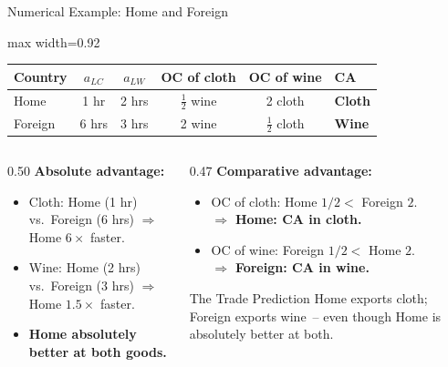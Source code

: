 \documentclass[aspectratio=169]{beamer}
\begin{document}
\begin{frame}{Numerical Example: Home and Foreign}
\begin{center}
\begin{adjustbox}{max width=0.92\textwidth}
\begin{tabular}{lccccl}
\toprule
\textbf{Country}&$a_{LC}$&$a_{LW}$&
\textbf{OC of cloth}&\textbf{OC of wine}&\textbf{CA}\\
\midrule
Home   & 1 hr & 2 hrs & $\tfrac{1}{2}$ wine &
         2 cloth & \textbf{Cloth}\\
Foreign& 6 hrs& 3 hrs & 2 wine &
         $\tfrac{1}{2}$ cloth & \textbf{Wine}\\
\bottomrule
\end{tabular}
\end{adjustbox}
\end{center}
\vspace{0.2em}
\begin{columns}[T]
\begin{column}{0.50\textwidth}
\textbf{Absolute advantage:}
\begin{itemize}\small
  \item Cloth: Home (1 hr) vs.\ Foreign (6 hrs)
        $\Rightarrow$ Home $6\times$ faster.
  \item Wine: Home (2 hrs) vs.\ Foreign (3 hrs)
        $\Rightarrow$ Home $1.5\times$ faster.
  \item \textbf{Home absolutely better at both goods.}
\end{itemize}
\end{column}
\begin{column}{0.47\textwidth}
\textbf{Comparative advantage:}
\begin{itemize}\small
  \item OC of cloth: Home $1/2 <$ Foreign $2$.\\
        $\Rightarrow$ \textbf{Home: CA in cloth.}
  \item OC of wine: Foreign $1/2 <$ Home $2$.\\
        $\Rightarrow$ \textbf{Foreign: CA in wine.}
\end{itemize}
\vspace{0.2em}
\begin{alertblock}{The Trade Prediction}
\small Home exports cloth; Foreign exports wine~--
even though Home is absolutely better at both.
\end{alertblock}
\end{column}
\end{columns}
\end{frame}
\end{document}
